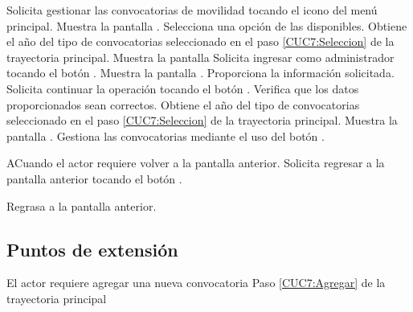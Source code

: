 	\begin{UCtrayectoria}
		\UCpaso[\UCactor] Solicita gestionar las convocatorias de movilidad tocando el icono \botMovilidad del menú principal.
		\UCpaso [\UCsist] Muestra la pantalla .
		\UCpaso[\UCactor] \label{CUC7:Seleccion} Selecciona una opción de las disponibles.
		\UCpaso [\UCsist] Obtiene el año del tipo de convocatorias seleccionado en el paso \ref{CUC7:Seleccion} de la trayectoria principal.
		\UCpaso [\UCsist] Muestra la pantalla 
		\UCpaso [\UCactor] Solicita ingresar como administrador tocando el botón . 
		\UCpaso [\UCsist] Muestra la pantalla .
		\UCpaso [\UCactor] \label{CUC7:Datos} Proporciona la información solicitada.
		\UCpaso [\UCactor] Solicita continuar la operación tocando el botón . 
		\UCpaso [\UCsist] Verifica que los datos proporcionados sean correctos. 
		\UCpaso [\UCsist] Obtiene el año del tipo de convocatorias seleccionado en el paso \ref{CUC7:Seleccion} de la trayectoria principal.
		\UCpaso [\UCsist] Muestra la pantalla .
		\UCpaso [\UCactor]  \label{CUC7:Agregar} Gestiona las convocatorias mediante el uso del botón .
		
	\end{UCtrayectoria}
	
	\begin{UCtrayectoriaA}{A}{Cuando el actor requiere volver a la pantalla anterior.}
		\UCpaso[\UCactor] Solicita regresar a la pantalla anterior tocando el botón .
		
		\UCpaso [\UCsist] Regrasa a la pantalla anterior.
	\end{UCtrayectoriaA}
	
	\subsection{Puntos de extensión}
	
	\UCExtensionPoint
	{El actor requiere agregar una nueva convocatoria}
	{ Paso \ref{CUC7:Agregar} de la trayectoria principal}
	{}
	